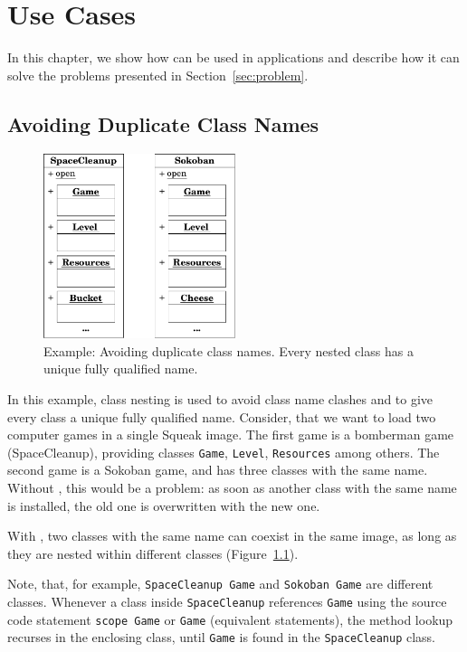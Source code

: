 \chapter{Use Cases}
\label{sec:usecases}
In this chapter, we show how \msname can be used in applications and describe how it can solve the problems presented in Section~\ref{sec:problem}.

\section{Avoiding Duplicate Class Names}
\begin{figure}
	\includegraphics[width=0.5\textwidth]{usecase_class_clash.pdf}
	\centering
	\caption[Example: Avoiding duplicate class names]{Example: Avoiding duplicate class names. Every nested class has a unique fully qualified name.}
	\label{fig:use_class_clash}
\end{figure}

In this example, class nesting is used to avoid class name clashes and to give every class a unique fully qualified name. Consider, that we want to load two computer games in a single Squeak image. The first game is a bomberman game (SpaceCleanup), providing classes \texttt{Game}, \texttt{Level}, \texttt{Resources} among others. The second game is a Sokoban game, and has three classes with the same name. Without \msname, this would be a problem: as soon as another class with the same name is installed, the old one is overwritten with the new one.

With \msname, two classes with the same name can coexist in the same image, as long as they are nested within different classes (Figure~\ref{fig:use_class_clash}).

Note, that, for example, \texttt{SpaceCleanup Game} and \texttt{Sokoban Game} are different classes. Whenever a class inside \texttt{SpaceCleanup} references \texttt{Game} using the source code statement \texttt{scope Game} or \texttt{Game} (equivalent statements), the method lookup recurses in the enclosing class, until \texttt{Game} is found in the \texttt{SpaceCleanup} class.

